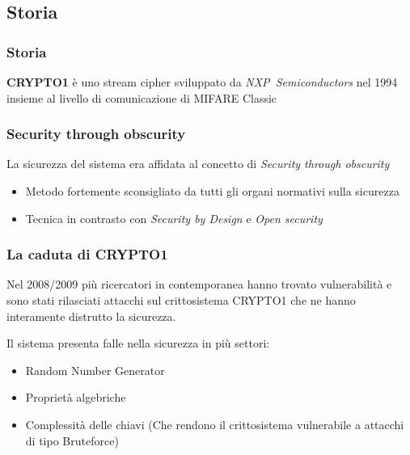 \subsection{Storia}

\begin{frame}
    \frametitle{Storia}
    \textbf{CRYPTO1} è uno stream cipher sviluppato da \textit{NXP~Semiconductors} nel 1994
    insieme al livello di comunicazione di MIFARE Classic~\cite{tezcan2017brute}\pause
\end{frame}


\begin{frame}
    \frametitle{Security through obscurity}
    La sicurezza del sistema era affidata al concetto di \textit{Security through obscurity}

    \begin{itemize}
        \item <2-> Metodo fortemente sconsigliato da tutti gli organi normativi sulla sicurezza\cite{scarfone2008guide}
        \item <3-> Tecnica in contrasto con \textit{Security by Design} e \textit{Open security}
    \end{itemize}
\end{frame}

\begin{frame}
    \frametitle{La caduta di CRYPTO1}
    Nel 2008/2009 più ricercatori in contemporanea hanno trovato vulnerabilità e sono stati rilasciati attacchi sul crittosistema CRYPTO1
    che ne hanno interamente distrutto la sicurezza.\cite{garcia2008dismantling}\cite{courtois2008algebraic}\cite{nohl2008reverse}\pause

    Il sistema presenta falle nella sicurezza in più settori:

    \begin{itemize}
        \item <2-> Random Number Generator
        \item <3-> Proprietà algebriche
        \item <4-> Complessità delle chiavi (Che rendono il crittosistema vulnerabile a attacchi di tipo Bruteforce\cite{courtois2008algebraic})
    \end{itemize}
\end{frame}

